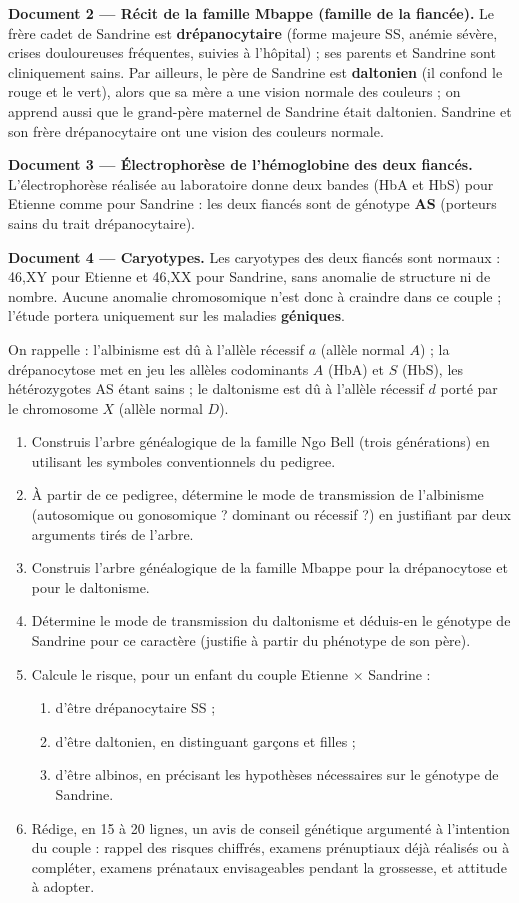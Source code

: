 \documentclass[11pt]{article}
\newcommand{\cle}[1]{{\popxbold\color{popdark}#1}}
\newcounter{popsec}
\newcounter{popsub}
\newcommand{\courssub}[1]{%
  \stepcounter{popsub}%
  \par\vspace{9pt}\noindent{\popxbold\fontsize{11.5}{13}\selectfont\color{popink}{\color{poporange}\thepopsec.\thepopsub}\hspace{6pt}#1}\par\nopagebreak\vspace{4pt}
}
\begin{document}
\textbf{Document 2 — Récit de la famille Mbappe (famille de la fiancée).}
Le frère cadet de Sandrine est \textbf{drépanocytaire} (forme majeure SS, anémie sévère, crises douloureuses fréquentes, suivies à l'hôpital) ; ses parents et Sandrine sont cliniquement sains. Par ailleurs, le père de Sandrine est \textbf{daltonien} (il confond le rouge et le vert), alors que sa mère a une vision normale des couleurs ; on apprend aussi que le grand-père maternel de Sandrine était daltonien. Sandrine et son frère drépanocytaire ont une vision des couleurs normale.

\textbf{Document 3 — Électrophorèse de l'hémoglobine des deux fiancés.}
L'électrophorèse réalisée au laboratoire donne deux bandes (HbA et HbS) pour Etienne comme pour Sandrine : les deux fiancés sont de génotype \textbf{AS} (porteurs sains du trait drépanocytaire).

\textbf{Document 4 — Caryotypes.}
Les caryotypes des deux fiancés sont normaux : 46,XY pour Etienne et 46,XX pour Sandrine, sans anomalie de structure ni de nombre. Aucune anomalie chromosomique n'est donc à craindre dans ce couple ; l'étude portera uniquement sur les maladies \textbf{géniques}.

On rappelle : l'\cle{albinisme} est dû à l'allèle récessif $a$ (allèle normal $A$) ; la \cle{drépanocytose} met en jeu les allèles codominants $A$ (HbA) et $S$ (HbS), les hétérozygotes AS étant sains ; le \cle{daltonisme} est dû à l'allèle récessif $d$ porté par le chromosome $X$ (allèle normal $D$).

\courssub{Consignes}

\begin{enumerate}
\item Construis l'arbre généalogique de la famille Ngo Bell (trois générations) en utilisant les symboles conventionnels du pedigree.
\item À partir de ce pedigree, détermine le mode de transmission de l'albinisme (autosomique ou gonosomique ? dominant ou récessif ?) en justifiant par deux arguments tirés de l'arbre.
\item Construis l'arbre généalogique de la famille Mbappe pour la drépanocytose et pour le daltonisme.
\item Détermine le mode de transmission du daltonisme et déduis-en le génotype de Sandrine pour ce caractère (justifie à partir du phénotype de son père).
\item Calcule le risque, pour un enfant du couple Etienne $\times$ Sandrine :
\begin{enumerate}
\item d'être drépanocytaire SS ;
\item d'être daltonien, en distinguant garçons et filles ;
\item d'être albinos, en précisant les hypothèses nécessaires sur le génotype de Sandrine.
\end{enumerate}
\item Rédige, en 15 à 20 lignes, un avis de conseil génétique argumenté à l'intention du couple : rappel des risques chiffrés, examens prénuptiaux déjà réalisés ou à compléter, examens prénataux envisageables pendant la grossesse, et attitude à adopter.
\end{enumerate}
\end{document}
